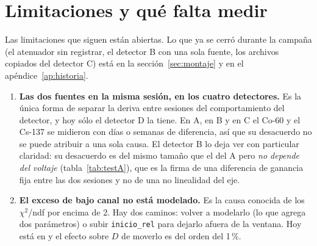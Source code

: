 \documentclass[11pt,a4paper]{article}
\begin{document}
\section{Limitaciones y qué falta medir}
\label{sec:limites}

Las limitaciones que siguen están abiertas. Lo que ya se cerró durante la
campaña (el atenuador sin registrar, el detector B con una sola fuente, los
archivos copiados del detector C) está en la sección~\ref{sec:montaje} y en
el apéndice~\ref{ap:historia}.

\begin{enumerate}
\item \textbf{Las dos fuentes en la misma sesión, en los cuatro detectores.}
      Es la única forma de separar la deriva entre sesiones del comportamiento
      del detector, y hoy sólo el detector D la tiene. En A, en B y en C el
      Co-60 y el Cs-137 se midieron con días o semanas de diferencia, así que
      su desacuerdo no se puede atribuir a una sola causa. El detector B lo
      deja ver con particular claridad: su desacuerdo es del mismo tamaño que
      el del A pero \emph{no depende del voltaje} (tabla~\ref{tab:testA}),
      que es la firma de una diferencia de ganancia fija entre las dos
      sesiones y no de una no linealidad del eje.

\item \textbf{El exceso de bajo canal no está modelado.} Es la causa conocida
      de los $\chi^2$/ndf por encima de 2. Hay dos caminos: volver a modelarlo
      (lo que agrega dos parámetros) o subir \texttt{inicio\_rel} para dejarlo
      afuera de la ventana. Hoy está en \InicioRel{} y el efecto sobre $D$ de
      moverlo es del orden del 1\,\%.


\end{enumerate}
\end{document}

